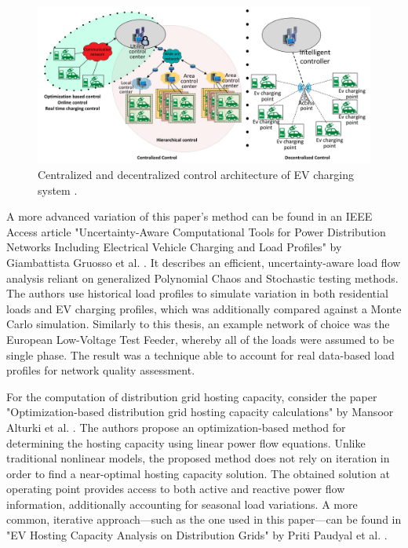\documentclass[a4paper,10pt]{report}
\begin{document}
\begin{figure}[htpb]
	\centering
	\includegraphics[width=\linewidth]{centralized_vs_decentr_ctrl}
	\caption[Centralized and decentralized control architecture]{Centralized and decentralized control architecture of EV charging system \cite{Das2020}.}
	\label{centralized_vs_decentr_ctrl}
\end{figure}

A more advanced variation of this paper's method can be found in an IEEE Access article "Uncertainty-Aware Computational Tools for Power Distribution Networks Including Electrical Vehicle Charging and Load Profiles" by Giambattista Gruosso et al. \cite{Gruosso2019}. It describes an efficient, uncertainty-aware load flow analysis reliant on generalized Polynomial Chaos and Stochastic testing methods. The authors use historical load profiles to simulate variation in both residential loads and EV charging profiles, which was additionally compared against a Monte Carlo simulation. Similarly to this thesis, an example network of choice was the European Low-Voltage Test Feeder, whereby all of the loads were assumed to be single phase. The result was a technique able to account for real data-based load profiles for network quality assessment.

For the computation of distribution grid hosting capacity, consider the paper "Optimization-based distribution grid hosting capacity calculations" by Mansoor Alturki et al. \cite{Alturki2018}. The authors propose an optimization-based method for determining the hosting capacity using linear power flow equations. Unlike traditional nonlinear models, the proposed method does not rely on iteration in order to find a near-optimal hosting capacity solution. The obtained solution at operating point provides access to both active and reactive power flow information, additionally accounting for seasonal load variations. A more common, iterative approach---such as the one used in this paper---can be found in "EV Hosting Capacity Analysis on Distribution Grids" by Priti Paudyal et al. \cite{PritiPaudyal2021}.
\end{document}
